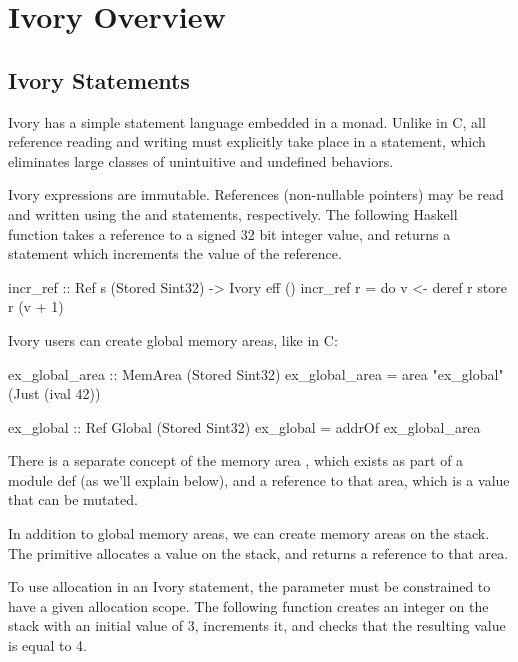 \section{Ivory Overview}
\label{sec:ivory-overview}



\subsection{Ivory Statements}


Ivory has a simple statement language embedded in a monad. Unlike in C, all
reference reading and writing must explicitly take place in a statement, which
eliminates large classes of unintuitive and undefined behaviors.

Ivory expressions are immutable. References (non-nullable pointers) may be
read and written using the  and  statements, respectively.
The following Haskell function takes a reference to a signed 32 bit integer value,
and returns a statement which increments the value of the reference.

\begin{code}
incr_ref :: Ref s (Stored Sint32) -> Ivory eff ()
incr_ref r = do
    v <- deref r
    store r (v + 1)
\end{code}

Ivory users can create global memory areas, like in C:
\begin{code}
ex_global_area :: MemArea (Stored Sint32)
ex_global_area = area "ex_global" (Just (ival 42))

ex_global :: Ref Global (Stored Sint32)
ex_global = addrOf ex_global_area
\end{code}

There is a separate concept of the memory area , which
exists as part of a module def (as we'll explain below), and a reference
to that area, which is a value that can be mutated.

In addition to global memory areas, we can create memory areas on the stack.
The  primitive allocates a value on the stack, and returns a reference to
that area.

To use allocation in an Ivory statement, the  parameter must be
constrained to have a given allocation scope. The following function creates an integer
on the stack with an initial value of 3, increments it, and checks that the resulting
value is equal to 4.

